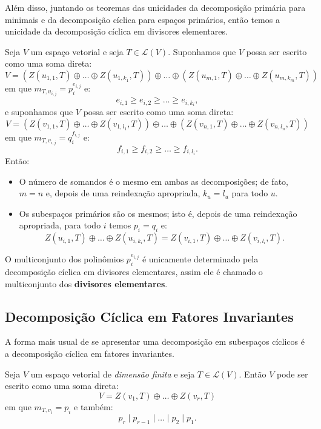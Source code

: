 \documentclass[11pt,twoside,a4paper]{book}
\begin{document}
\noindent
Além disso, juntando os teoremas das unicidades da decomposição primária para minimais e da decomposição cíclica para espaços primários, então temos a unicidade da decomposição cíclica em divisores elementares.

\begin{teorema}
Seja $V$ um espaço vetorial e seja $T\in\mathcal{L}(V)$. Suponhamos que $V$ possa ser escrito como uma soma direta:
\[
V=\left(Z(u_{1,1},T)\oplus\dots\oplus Z(u_{1,k_1},T)\right)\oplus\dots\oplus\left(Z(u_{m,1},T)\oplus\dots\oplus Z(u_{m,k_m},T)\right)
\]
em que $m_{T,u_{i,j}}=p_i^{e_{i,j}}$ e:
\[
e_{i,1}\geq e_{i,2}\geq\dots\geq e_{i,k_i},
\]
e suponhamos que $V$ possa ser escrito como uma soma direta:
\[
V=\left(Z(v_{1,1},T)\oplus\dots\oplus Z(v_{1,l_1},T)\right)\oplus\dots\oplus\left(Z(v_{n,1},T)\oplus\dots\oplus Z(v_{n,l_n},T)\right)
\]
em que $m_{T,v_{i,j}}=q_i^{f_{i,j}}$ e:
\[
f_{i,1}\geq f_{i,2}\geq\dots\geq f_{i,l_i}.
\]
Então:
\begin{itemize}
\item O número de somandos é o mesmo em ambas as decomposições; de fato,
$m=n$ e, depois de uma reindexação apropriada, $k_u=l_u$ para todo $u$.
\item Os subespaços primários são os mesmos; isto é, depois de uma reindexação apropriada, para todo $i$ temos $p_i=q_i$ e:
\[
Z(u_{i,1},T)\oplus\dots\oplus Z(u_{i,k_i},T)=Z(v_{i,1},T)\oplus\dots\oplus Z(v_{i,l_i},T).
\]
\end{itemize}
\end{teorema}

\begin{definicao}
O multiconjunto dos polinômios $p_i^{e_{i,j}}$ é unicamente determinado pela decomposição cíclica em divisores elementares, assim ele é chamado o multiconjunto dos \textbf{divisores elementares}.
\end{definicao}

\subsection{Decomposição Cíclica em Fatores Invariantes}

A forma mais usual de se apresentar uma decomposição em subespaços cíclicos é a decomposição cíclica em fatores invariantes.

\begin{teorema}
Seja $V$ um espaço vetorial de \emph{dimensão finita} e seja $T\in\mathcal{L}(V)$. Então $V$ pode ser escrito como uma soma direta:
\[
V=Z(v_1,T)\oplus\dots\oplus Z(v_r,T)
\]
em que $m_{T,v_i}=p_i$ e também:
\[
p_r\mid p_{r-1}\mid\dots\mid p_2\mid p_1.
\]
\end{teorema}
\end{document}
